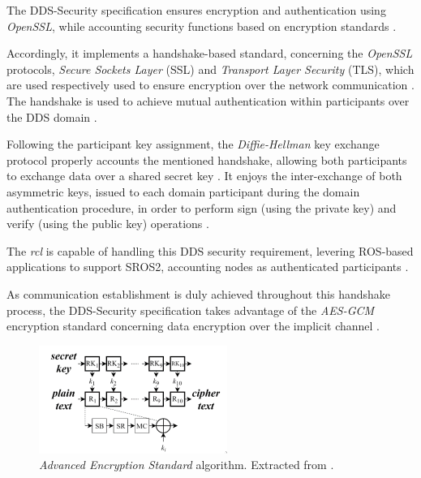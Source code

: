 
The DDS-Security specification ensures encryption and authentication using \textit{OpenSSL}, while accounting security functions based on encryption standards \cite{takemoto2019performance}. 

Accordingly, it implements a handshake-based standard, concerning the \textit{OpenSSL} protocols, \textit{Secure Sockets Layer} (SSL) and \textit{Transport Layer Security} (TLS), which are used respectively used to ensure encryption over the network communication \cite{white2016sros, kim2018security}. The handshake is used to achieve mutual authentication within participants over the DDS domain \cite{white2019network}.

Following the participant key assignment, the \textit{Diffie-Hellman} key exchange protocol properly accounts the mentioned handshake, allowing both participants to exchange data over a shared secret key \cite{kim2018security}. %
It enjoys the inter-exchange of both asymmetric keys, issued to each domain participant during the domain authentication procedure, in order to perform sign (using the private key) and verify (using the public key) operations \cite{kim2018security, diluoffo2018robot}.

The \textit{rcl} is capable of handling this DDS security requirement, levering ROS-based applications to support SROS2, accounting nodes as authenticated participants \cite{white2016sros}. 

As communication establishment is duly achieved throughout this handshake process, the DDS-Security specification takes advantage of the \textit{AES-GCM} encryption standard concerning data encryption over the implicit channel \cite{kim2018security, takemoto2019performance}.

\begin{figure}[H]
    \centering
    \includegraphics[width=0.4\linewidth]{img/ros_aes.png}
    \caption{\textit{Advanced Encryption Standard} algorithm. Extracted from \cite{takemoto2019performance}.}
    \label{fig:ros_aes}
\end{figure}


